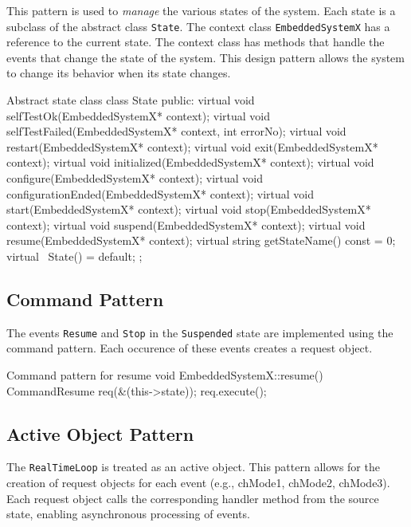 \documentclass[../main.tex]{subfiles}
\begin{document}
This pattern is used to \textit{manage} the various states of the system. Each state is a subclass of the abstract class \texttt{State}. The context class \texttt{EmbeddedSystemX} has a reference to the current state. The context class has methods that handle the events that change the state of the system. This design pattern allows the system to change its behavior when its state changes.

\begin{myminted}{Abstract state class}
class State {
    public:
    virtual void selfTestOk(EmbeddedSystemX* context){};
    virtual void selfTestFailed(EmbeddedSystemX* context, int errorNo){};
    virtual void restart(EmbeddedSystemX* context){};
    virtual void exit(EmbeddedSystemX* context){};
    virtual void initialized(EmbeddedSystemX* context){};
    virtual void configure(EmbeddedSystemX* context){};
    virtual void configurationEnded(EmbeddedSystemX* context){};
    virtual void start(EmbeddedSystemX* context){};
    virtual void stop(EmbeddedSystemX* context){};
    virtual void suspend(EmbeddedSystemX* context){};
    virtual void resume(EmbeddedSystemX* context){};
    virtual string getStateName() const = 0;
    virtual ~State() = default;
};
\end{myminted}

\subsection{Command Pattern}

The events \texttt{Resume} and \texttt{Stop} in the \texttt{Suspended} state are implemented using the command pattern. Each occurence of these events creates a request object.

\begin{myminted}{Command pattern for resume}
void EmbeddedSystemX::resume() {
    CommandResume req(&(this->state));
    req.execute();
}
\end{myminted}

\subsection{Active Object Pattern}

The \texttt{RealTimeLoop} is treated as an active object. This pattern allows for the creation of request objects for each event (e.g., chMode1, chMode2, chMode3). Each request object calls the corresponding handler method from the source state, enabling asynchronous processing of events.
\end{document}
